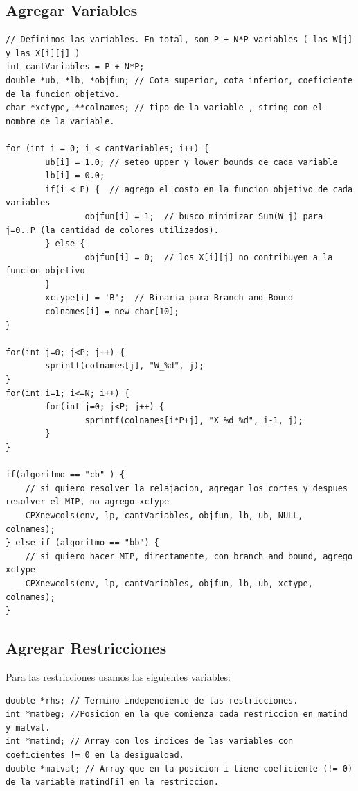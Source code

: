 \documentclass[a4paper, 10pt, twoside]{article}
\begin{document}
\subsection{Agregar Variables}

\begin{lstlisting}
// Definimos las variables. En total, son P + N*P variables ( las W[j] y las X[i][j] )
int cantVariables = P + N*P;
double *ub, *lb, *objfun; // Cota superior, cota inferior, coeficiente de la funcion objetivo.
char *xctype, **colnames; // tipo de la variable , string con el nombre de la variable.

for (int i = 0; i < cantVariables; i++) {
		ub[i] = 1.0; // seteo upper y lower bounds de cada variable
		lb[i] = 0.0;
		if(i < P) {  // agrego el costo en la funcion objetivo de cada variables
				objfun[i] = 1;  // busco minimizar Sum(W_j) para j=0..P (la cantidad de colores utilizados).
		} else {
				objfun[i] = 0;  // los X[i][j] no contribuyen a la funcion objetivo
		}
		xctype[i] = 'B';  // Binaria para Branch and Bound
		colnames[i] = new char[10];
}

for(int j=0; j<P; j++) {
		sprintf(colnames[j], "W_%d", j);
}
for(int i=1; i<=N; i++) {
		for(int j=0; j<P; j++) {
				sprintf(colnames[i*P+j], "X_%d_%d", i-1, j);
		}
}

if(algoritmo == "cb" ) {
	// si quiero resolver la relajacion, agregar los cortes y despues resolver el MIP, no agrego xctype
	CPXnewcols(env, lp, cantVariables, objfun, lb, ub, NULL, colnames);
} else if (algoritmo == "bb") {
	// si quiero hacer MIP, directamente, con branch and bound, agrego xctype
	CPXnewcols(env, lp, cantVariables, objfun, lb, ub, xctype, colnames);
}
\end{lstlisting}

\subsection{Agregar Restricciones}

Para las restricciones usamos las siguientes variables:

\begin{lstlisting}
double *rhs; // Termino independiente de las restricciones.
int *matbeg; //Posicion en la que comienza cada restriccion en matind y matval.
int *matind; // Array con los indices de las variables con coeficientes != 0 en la desigualdad.
double *matval; // Array que en la posicion i tiene coeficiente (!= 0) de la variable matind[i] en la restriccion.
\end{lstlisting}
\end{document}
